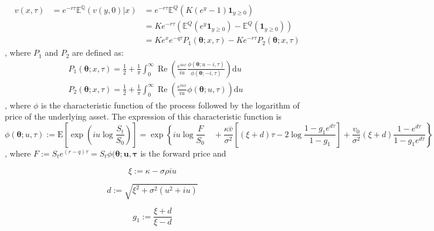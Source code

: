 \documentclass[12,twoside]{mammeTFM}
\theoremstyle{definition}
\theoremstyle{remark}
\newcommand{\E}{\ensuremath{\mathbb{E}}}
\newcommand{\Q}{\ensuremath{\mathbb{Q}}}
\begin{document}
\begin{align} 
\label{eq:option_valuation_expectation}
& v(x, \tau) & = e^{-r \tau}\E^{\Q}(v(y, 0)|x) & = e^{-r \tau} \E^{Q}(K(e^y - 1)\boldsymbol{1}_{y \geq 0}) \\  
\label{eq:option_valuation_useless}
&  &  & = Ke^{-r \tau}(\E^{Q}(e^y \boldsymbol{1}_{y \geq 0}) - \E^{Q}(\boldsymbol{1}_{y \geq 0})) \\
\label{eq:option_valuation_final_form}
&  &  & = K e^x e^{-q \tau} P_1(\boldsymbol{\theta}; x, \tau) - K e^{-r \tau} P_2(\boldsymbol{\theta}; x, \tau)
\end{align}
, where $P_1$ and $P_2$ are defined as:
\begin{align}
&P_{1}(\boldsymbol{\theta} ; x, \tau)=\frac{1}{2}+\frac{1}{\pi} \int_{0}^{\infty} \operatorname{Re}\left(\frac{e^{i u x}}{i u} \frac{\phi(\boldsymbol{\theta} ; u-i, \tau)}{\phi(\boldsymbol{\theta} ;-i, \tau)}\right) \mathrm{d} u\\
&P_{2}(\boldsymbol{\theta} ; x, \tau)=\frac{1}{2}+\frac{1}{\pi} \int_{0}^{\infty} \operatorname{Re}\left(\frac{e^{iux}}{i u} \phi(\boldsymbol{\theta} ; u, \tau)\right) \mathrm{d} u
\end{align}
, where $\phi$ is the characteristic function of the process followed by the logarithm of price of the underlying asset. The expression of this characteristic function is
\begin{equation} \label{eq:char_heston}
\phi(\boldsymbol{\theta} ; u, \tau):=\mathrm{E}\left[\exp \left(i u \log \frac{S_{t}}{S_{0}}\right)\right]=\exp \left\{i u \log \frac{F}{S_{0}}\right.
\left.\quad+\frac{\kappa \bar{v}}{\sigma^{2}}\left[(\xi+d) \tau-2 \log \frac{1-g_{1} e^{d \tau}}{1-g_{1}}\right]+\frac{v_{0}}{\sigma^{2}}(\xi+d) \frac{1-e^{d \tau}}{1-g_{1} e^{d \tau}}\right\}
\end{equation}
, where $F := S_t e^{(r - q) \tau} = S_t \phi(\boldsymbol{\theta; u, \tau}$ is the forward price and

\noindent\begin{minipage}{.3\linewidth}
\begin{equation}
\xi:=\kappa-\sigma \rho i u
\end{equation}
\end{minipage}
\noindent\begin{minipage}{.4\linewidth}
\begin{equation} \label{eq:char_d}
d:=\sqrt{\xi^{2}+\sigma^{2}\left(u^{2}+i u\right)}
\end{equation}
\end{minipage}
\noindent\begin{minipage}{.3\linewidth}
\begin{equation}
g_{1}:=\frac{\xi+d}{\xi-d}
\end{equation}
\end{minipage}
\end{document}
